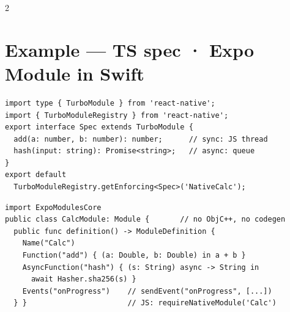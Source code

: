 \documentclass[8pt]{extarticle}
\begin{document}
\begin{multicols}{2}
\section{Example — TS spec · Expo Module in Swift}
\begin{lstlisting}[language=TSSheet]
import type { TurboModule } from 'react-native';
import { TurboModuleRegistry } from 'react-native';
export interface Spec extends TurboModule {
  add(a: number, b: number): number;      // sync: JS thread
  hash(input: string): Promise<string>;   // async: queue
}
export default
  TurboModuleRegistry.getEnforcing<Spec>('NativeCalc');
\end{lstlisting}
\begin{lstlisting}[language=SwiftSheet]
import ExpoModulesCore
public class CalcModule: Module {       // no ObjC++, no codegen
  public func definition() -> ModuleDefinition {
    Name("Calc")
    Function("add") { (a: Double, b: Double) in a + b }
    AsyncFunction("hash") { (s: String) async -> String in
      await Hasher.sha256(s) }
    Events("onProgress")    // sendEvent("onProgress", [...])
  } }                       // JS: requireNativeModule('Calc')
\end{lstlisting}

\columnbreak


\end{multicols}
\end{document}
